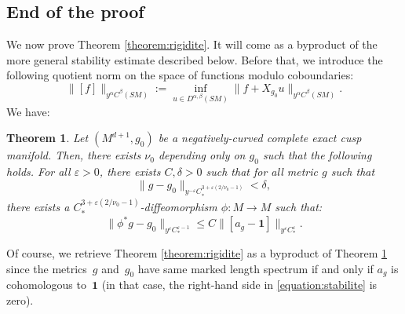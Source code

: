 \documentclass[10pt]{amsart}
\newcommand{\eps}{\varepsilon}
\theoremstyle{plain}
\newtheorem{theorem}{Theorem}[section]
\theoremstyle{definition}
\begin{document}
\subsection{End of the proof}

\label{section:proofs}

We now prove Theorem \ref{theorem:rigidite}. It will come as a byproduct of the more general stability estimate described below. Before that, we introduce the following quotient norm on the space of functions modulo coboundaries:
\[
\|[f]\|_{y^\alpha C^\beta(SM)} := \inf_{u \in D^{\alpha,\beta}(SM)} \|f + X_{g_0}u\|_{y^\alpha C^\beta(SM)}.
\]
We have:


\begin{theorem}
\label{theorem:stabilite}
Let $(M^{d+1},g_0)$ be a negatively-curved complete exact cusp manifold. Then, there exists $\nu_0$ depending only on $g_0$ such that the following holds. For all $\eps > 0$, there exists $C,\delta >0$ such that for all metric $g$ such that
\[
\|g-g_0\|_{y^{-\eps} C^{3+\eps(2/\nu_0-1)}_*} < \delta,
\]
there exists a $C^{3+\eps(2/\nu_0-1)}_*$-diffeomorphism $\phi : M \to M$ such that:
\begin{equation}
\label{equation:stabilite}
\|\phi^*g -g_0\|_{y^{\eps} C^{\eps-1}_*} \leq C \|[a_g-\mathbf{1}]\|_{y^{\eps}C^{ \eps}_*}.
\end{equation}
\end{theorem}


Of course, we retrieve Theorem \ref{theorem:rigidite} as a byproduct of Theorem \ref{theorem:stabilite} since the metrics~$g$ and~$g_0$ have same marked length spectrum if and only if $a_g$ is cohomologous to~$\mathbf{1}$ (in that case, the right-hand side in \eqref{equation:stabilite} is zero).
\end{document}
